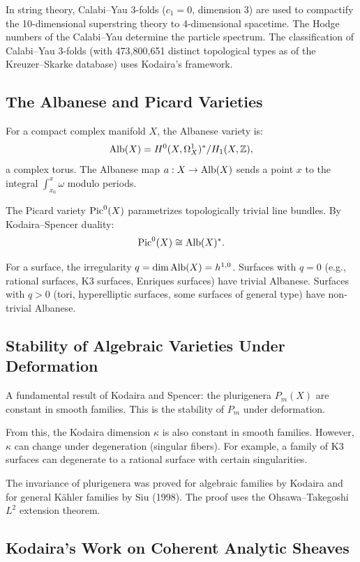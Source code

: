 In string theory, Calabi--Yau 3-folds ($c_1 = 0$, dimension 3) are used to compactify the 10-dimensional superstring theory to 4-dimensional spacetime. The Hodge numbers of the Calabi--Yau determine the particle spectrum. The classification of Calabi--Yau 3-folds (with 473,800,651 distinct topological types as of the Kreuzer--Skarke database) uses Kodaira's framework.

\subsection{The Albanese and Picard Varieties}

For a compact complex manifold $X$, the Albanese variety is:
\[
\operatorname{Alb}(X) = H^0(X, \Omega^1_X)^* / H_1(X, \mathbb{Z}),
\]
a complex torus. The Albanese map $a: X \to \operatorname{Alb}(X)$ sends a point $x$ to the integral $\int_{x_0}^x \omega$ modulo periods.

The Picard variety $\operatorname{Pic}^0(X)$ parametrizes topologically trivial line bundles. By Kodaira--Spencer duality:
\[
\operatorname{Pic}^0(X) \cong \operatorname{Alb}(X)^*.
\]

For a surface, the irregularity $q = \dim \operatorname{Alb}(X) = h^{1,0}$. Surfaces with $q = 0$ (e.g., rational surfaces, K3 surfaces, Enriques surfaces) have trivial Albanese. Surfaces with $q > 0$ (tori, hyperelliptic surfaces, some surfaces of general type) have non-trivial Albanese.

\subsection{Stability of Algebraic Varieties Under Deformation}

A fundamental result of Kodaira and Spencer: the plurigenera $P_m(X)$ are constant in smooth families. This is the stability of $P_m$ under deformation.

From this, the Kodaira dimension $\kappa$ is also constant in smooth families. However, $\kappa$ can change under degeneration (singular fibers). For example, a family of K3 surfaces can degenerate to a rational surface with certain singularities.

The invariance of plurigenera was proved for algebraic families by Kodaira and for general K\"{a}hler families by Siu (1998). The proof uses the Ohsawa--Takegoshi $L^2$ extension theorem.

\subsection{Kodaira's Work on Coherent Analytic Sheaves}

